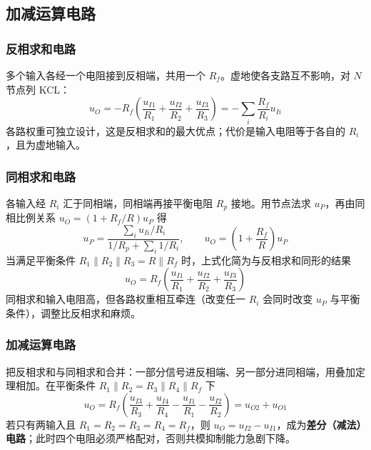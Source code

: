 \subsection{加减运算电路}
\subsubsection{反相求和电路}
多个输入各经一个电阻接到反相端，共用一个 $R_f$。虚地使各支路互不影响，对 $N$ 节点列 KCL：
\begin{equation}
u_O = -R_f\left(\frac{u_{I1}}{R_1}+\frac{u_{I2}}{R_2}+\frac{u_{I3}}{R_3}\right)
= -\sum_{i}\frac{R_f}{R_i}u_{Ii}
\end{equation}
各路权重可独立设计，这是反相求和的最大优点；代价是输入电阻等于各自的 $R_i$，且为虚地输入。

\subsubsection{同相求和电路}
各输入经 $R_i$ 汇于同相端，同相端再接平衡电阻 $R_p$ 接地。用节点法求 $u_P$，再由同相比例关系 $u_O=(1+R_f/R)u_P$ 得
\begin{equation}
u_P=\frac{\sum_i u_{Ii}/R_i}{1/R_p+\sum_i 1/R_i},\qquad
u_O=\left(1+\frac{R_f}{R}\right)u_P
\end{equation}
当满足平衡条件 $R_1\parallel R_2\parallel R_3=R\parallel R_f$ 时，上式化简为与反相求和同形的结果
\begin{equation}
u_O = R_f\left(\frac{u_{I1}}{R_1}+\frac{u_{I2}}{R_2}+\frac{u_{I3}}{R_3}\right)
\end{equation}
同相求和输入电阻高，但各路权重相互牵连（改变任一 $R_i$ 会同时改变 $u_P$ 与平衡条件），调整比反相求和麻烦。

\subsubsection{加减运算电路}
把反相求和与同相求和合并：一部分信号进反相端、另一部分进同相端，用叠加定理相加。在平衡条件 $R_1\parallel R_2=R_3\parallel R_4\parallel R_f$ 下
\begin{equation}
u_O = R_f\left(\frac{u_{I3}}{R_3}+\frac{u_{I4}}{R_4}-\frac{u_{I1}}{R_1}-\frac{u_{I2}}{R_2}\right)
= u_{O2}+u_{O1}
\end{equation}
若只有两输入且 $R_1=R_2=R_3=R_4=R_f$，则 $u_O=u_{I2}-u_{I1}$，成为\textbf{差分（减法）电路}；此时四个电阻必须严格配对，否则共模抑制能力急剧下降。


